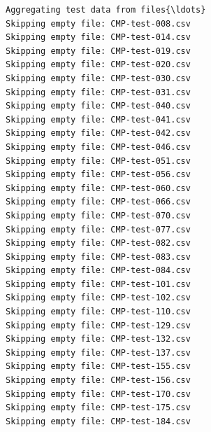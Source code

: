 \documentclass[11pt]{article}
\begin{document}
    \begin{Verbatim}[commandchars=\\\{\}]
Aggregating test data from files{\ldots}
Skipping empty file: CMP-test-008.csv
Skipping empty file: CMP-test-014.csv
Skipping empty file: CMP-test-019.csv
Skipping empty file: CMP-test-020.csv
Skipping empty file: CMP-test-030.csv
Skipping empty file: CMP-test-031.csv
Skipping empty file: CMP-test-040.csv
Skipping empty file: CMP-test-041.csv
Skipping empty file: CMP-test-042.csv
Skipping empty file: CMP-test-046.csv
Skipping empty file: CMP-test-051.csv
Skipping empty file: CMP-test-056.csv
Skipping empty file: CMP-test-060.csv
Skipping empty file: CMP-test-066.csv
Skipping empty file: CMP-test-070.csv
Skipping empty file: CMP-test-077.csv
Skipping empty file: CMP-test-082.csv
Skipping empty file: CMP-test-083.csv
Skipping empty file: CMP-test-084.csv
Skipping empty file: CMP-test-101.csv
Skipping empty file: CMP-test-102.csv
Skipping empty file: CMP-test-110.csv
Skipping empty file: CMP-test-129.csv
Skipping empty file: CMP-test-132.csv
Skipping empty file: CMP-test-137.csv
Skipping empty file: CMP-test-155.csv
Skipping empty file: CMP-test-156.csv
Skipping empty file: CMP-test-170.csv
Skipping empty file: CMP-test-175.csv
Skipping empty file: CMP-test-184.csv
    \end{Verbatim}
\end{document}
